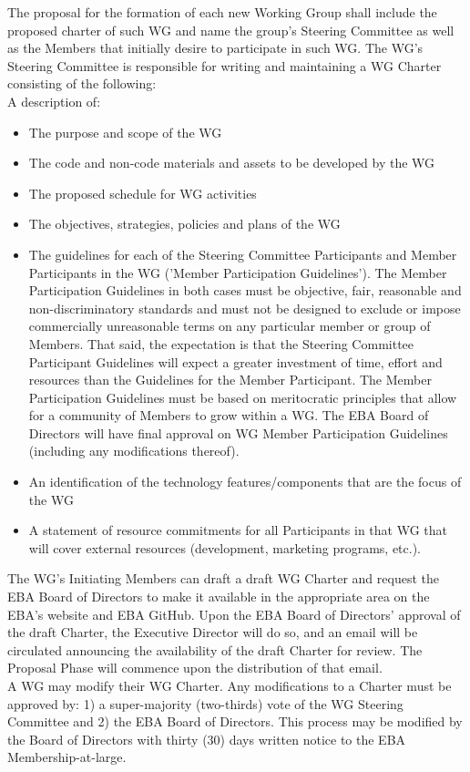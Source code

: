\documentclass{article}
\begin{document}
The proposal for the formation of each new Working Group shall include the proposed charter of such WG and name the group’s Steering Committee as well as the Members that initially desire to participate in such WG. 
The WG’s Steering Committee is responsible for writing and maintaining a WG Charter consisting of the following: \\

A description of: \\

\begin{itemize}
	\item The purpose and scope of the WG
	\item The code and non-code materials and assets to be developed by the WG
	\item The proposed schedule for WG activities
	\item The objectives, strategies, policies and plans of the WG
	\item The guidelines for each of the Steering Committee Participants and Member Participants in the WG ('Member Participation Guidelines'). 
	The Member Participation Guidelines in both cases must be objective, fair, reasonable and non-discriminatory standards and must not be designed to exclude or impose commercially unreasonable terms on any particular member or group of Members. 
	That said, the expectation is that the Steering Committee Participant Guidelines will expect a greater investment of time, effort and resources than the Guidelines for the Member Participant. 
	The Member Participation Guidelines must be based on meritocratic principles that allow for a community of Members to grow within a WG. 
	The EBA Board of Directors will have final approval on WG Member Participation Guidelines (including any modifications thereof).
	\item An identification of the technology features/components that are the focus of the WG
	\item A statement of resource commitments for all Participants in that WG that will cover external resources (development, marketing programs, etc.).
\end{itemize}

The WG’s Initiating Members can draft a draft WG Charter and request the EBA Board of Directors to make it available in the appropriate area on the EBA’s website and EBA GitHub.
 Upon the EBA Board of Directors’ approval of the draft Charter, the Executive Director will do so, and an email will be circulated announcing the availability of the draft Charter for review. 
 The Proposal Phase will commence upon the distribution of that email. \\
A WG may modify their WG Charter. 
Any modifications to a Charter must be approved by: 1) a super-majority (two-thirds) vote of the WG Steering Committee and 2) the EBA Board of Directors. 
This process may be modified by the Board of Directors with thirty (30) days written notice to the EBA Membership-at-large.
\end{document}
